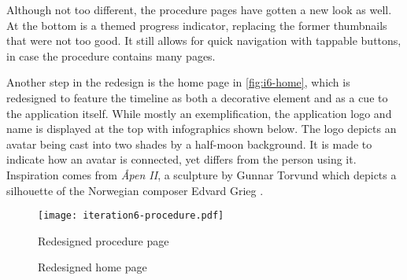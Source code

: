 Although not too different, the procedure pages have gotten a new look as well. At the bottom is a themed progress indicator, replacing the former thumbnails that were not too good. It still allows for quick navigation with tappable buttons, in case the procedure contains many pages.

Another step in the redesign is the home page in \autoref{fig:i6-home}, which is redesigned to feature the timeline as both a decorative element and as a cue to the application itself. While mostly an exemplification, the application logo and name is displayed at the top with infographics shown below. The logo depicts an avatar being cast into two shades by a half-moon background. It is made to indicate how an avatar is connected, yet differs from the person using it. Inspiration comes from \emph{Åpen II}, a sculpture by Gunnar Torvund which depicts a silhouette of the Norwegian composer Edvard Grieg \parencite{vaage2014}.

\begin{sidewaysfigure}
    \centering
    \hspace{\fill}
    \begin{minipage}[t]{0.35\textwidth}
        \centering
        \vspace{0pt}
        \texttt{[image: iteration6-procedure.pdf]}
        \caption{Redesigned procedure page}
        \label{fig:i6-procedure}
    \end{minipage}
    \hspace{\fill}
    \begin{minipage}[t]{0.35\textwidth}
        \centering
        \vspace{0pt}
        \caption{Redesigned home page}
        \label{fig:i6-home}
    \end{minipage}
    \hspace*{\fill}
\end{sidewaysfigure}


